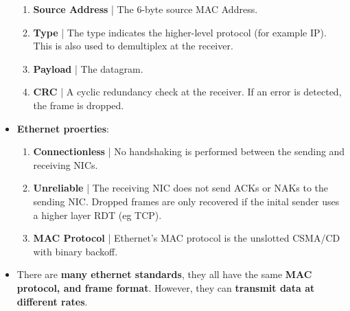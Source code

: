 \documentclass{article}
\begin{document}
\begin{itemize}
\begin{enumerate}
            \item \textbf{Source Address} | The 6-byte source MAC Address.
            \item \textbf{Type} | The type indicates the higher-level protocol (for example IP). This is also used to demultiplex at the receiver.
            \item \textbf{Payload} | The datagram.
            \item \textbf{CRC} | A cyclic redundancy check at the receiver. If an error is detected, the frame is dropped.
        \end{enumerate}
        \item \textbf{Ethernet proerties}:
        \begin{enumerate}
            \item \textbf{Connectionless} | No handshaking is performed between the sending and receiving NICs.
            \item \textbf{Unreliable} | The receiving NIC does not send ACKs or NAKs to the sending NIC. Dropped frames are only recovered if the inital sender uses a higher layer RDT (eg TCP).
            \item \textbf{MAC Protocol} | Ethernet's MAC protocol is the unslotted CSMA/CD with binary backoff.
        \end{enumerate}
        \item There are \textbf{many ethernet standards}, they all have the same \textbf{MAC protocol, and frame format}. However, they can \textbf{transmit data at different rates}.
    \end{itemize}
\end{document}
